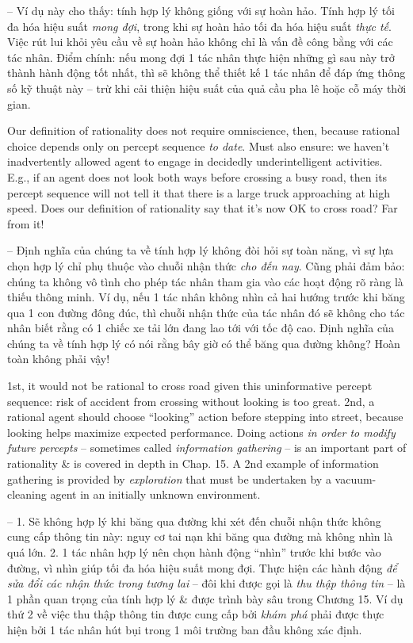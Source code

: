 \documentclass{article}
\begin{document}
\begin{itemize}
\begin{itemize}
\begin{itemize}
\begin{itemize}
				-- Ví dụ này cho thấy: tính hợp lý không giống với sự hoàn hảo. Tính hợp lý tối đa hóa hiệu suất {\it mong đợi}, trong khi sự hoàn hảo tối đa hóa hiệu suất {\it thực tế}. Việc rút lui khỏi yêu cầu về sự hoàn hảo không chỉ là vấn đề công bằng với các tác nhân. Điểm chính: nếu mong đợi 1 tác nhân thực hiện những gì sau này trở thành hành động tốt nhất, thì sẽ không thể thiết kế 1 tác nhân để đáp ứng thông số kỹ thuật này -- trừ khi cải thiện hiệu suất của quả cầu pha lê hoặc cỗ máy thời gian.

				Our definition of rationality does not require omniscience, then, because rational choice depends only on percept sequence {\it to date}. Must also ensure: we haven't inadvertently allowed agent to engage in decidedly underintelligent activities. E.g., if an agent does not look both ways before crossing a busy road, then its percept sequence will not tell it that there is a large truck approaching at high speed. Does our definition of rationality say that it's now OK to cross road? Far from it!

				-- Định nghĩa của chúng ta về tính hợp lý không đòi hỏi sự toàn năng, vì sự lựa chọn hợp lý chỉ phụ thuộc vào chuỗi nhận thức {\it cho đến nay}. Cũng phải đảm bảo: chúng ta không vô tình cho phép tác nhân tham gia vào các hoạt động rõ ràng là thiếu thông minh. Ví dụ, nếu 1 tác nhân không nhìn cả hai hướng trước khi băng qua 1 con đường đông đúc, thì chuỗi nhận thức của tác nhân đó sẽ không cho tác nhân biết rằng có 1 chiếc xe tải lớn đang lao tới với tốc độ cao. Định nghĩa của chúng ta về tính hợp lý có nói rằng bây giờ có thể băng qua đường không? Hoàn toàn không phải vậy!

				1st, it would not be rational to cross road given this uninformative percept sequence: risk of accident from crossing without looking is too great. 2nd, a rational agent should choose ``looking'' action before stepping into street, because looking helps maximize expected performance. Doing actions {\it in order to modify future percepts} -- sometimes called {\it information gathering} -- is an important part of rationality \& is covered in depth in Chap. 15. A 2nd example of information gathering is provided by {\it exploration} that must be undertaken by a vacuum-cleaning agent in an initially unknown environment.

				-- 1. Sẽ không hợp lý khi băng qua đường khi xét đến chuỗi nhận thức không cung cấp thông tin này: nguy cơ tai nạn khi băng qua đường mà không nhìn là quá lớn. 2. 1 tác nhân hợp lý nên chọn hành động ``nhìn'' trước khi bước vào đường, vì nhìn giúp tối đa hóa hiệu suất mong đợi. Thực hiện các hành động {\it để sửa đổi các nhận thức trong tương lai} -- đôi khi được gọi là {\it thu thập thông tin} -- là 1 phần quan trọng của tính hợp lý \& được trình bày sâu trong Chương 15. Ví dụ thứ 2 về việc thu thập thông tin được cung cấp bởi {\it khám phá} phải được thực hiện bởi 1 tác nhân hút bụi trong 1 môi trường ban đầu không xác định.


\end{itemize}
\end{itemize}
\end{itemize}
\end{itemize}
\end{document}
